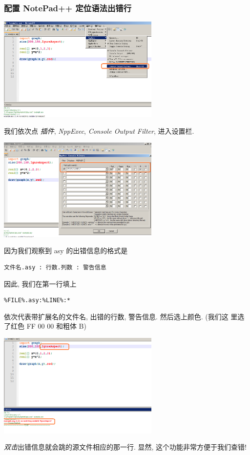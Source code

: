 \documentclass[nofonts,CJKnormalspaces]{ctexbook}
\begin{document}
\subsubsection{配置 NotePad++ 定位语法出错行}
\begin{center}
  \includegraphics[width=0.6\textwidth]{NotePad++a.png}
\end{center}
我们依次点 \emph{插件}, \emph{NppExec}, \emph{Console Output Filter},
进入设置栏.
\begin{center}
  \includegraphics[width=0.6\textwidth]{NotePad++b.png}
\end{center}
因为我们观察到 asy 的出错信息的格式是
\begin{verbatim}
文件名.asy : 行数.列数 : 警告信息
\end{verbatim}
因此, 我们在第一行填上
\begin{verbatim}
%FILE%.asy:%LINE%:*
\end{verbatim}
依次代表带扩展名的文件名, 出错的行数, 警告信息. 然后选上颜色. (我们这
里选了红色 FF 00 00  和粗体 B)
\begin{center}
  \includegraphics[width=0.6\textwidth]{NotePad++c.png}
\end{center}
\emph{双击}出错信息就会跳的源文件相应的那一行. 显然, 这个功能非常方便于我们查错!
\end{document}
